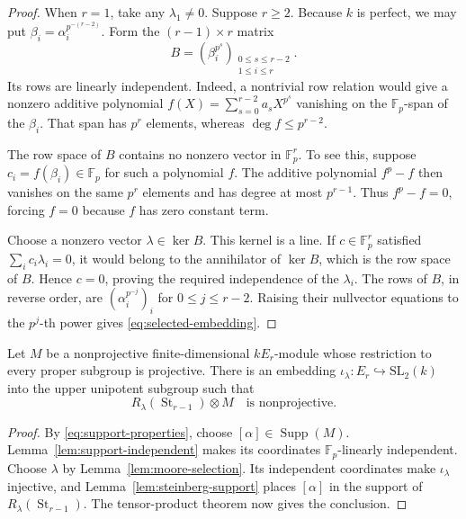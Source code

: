 \begin{proof}
When $r=1$, take any $\lambda_1\ne0$.  Suppose $r\ge2$.
Because $k$ is perfect, we may put
$\beta_i=\alpha_i^{p^{-(r-2)}}$.  Form the $(r-1)\times r$ matrix
\[
 B=(\beta_i^{p^s})_{\substack{0\le s\le r-2\\1\le i\le r}}.
\]
Its rows are linearly independent.  Indeed, a nontrivial row relation
would give a nonzero additive polynomial
$f(X)=\sum_{s=0}^{r-2}a_sX^{p^s}$ vanishing on the
$\mathbb F_p$-span of the $\beta_i$.  That span has $p^r$ elements,
whereas $\deg f\le p^{r-2}$.

The row space of $B$ contains no nonzero vector in $\mathbb F_p^r$.
To see this, suppose $c_i=f(\beta_i)\in\mathbb F_p$ for such a
polynomial $f$.  The additive polynomial $f^p-f$ then vanishes on
the same $p^r$ elements and has degree at most $p^{r-1}$.
Thus $f^p-f=0$, forcing $f=0$ because $f$ has zero constant term.

Choose a nonzero vector $\lambda\in\ker B$.  This kernel is a line.
If $c\in\mathbb F_p^r$ satisfied $\sum_i c_i\lambda_i=0$, it would
belong to the annihilator of $\ker B$, which is the row space of $B$.
Hence $c=0$, proving the required independence of the $\lambda_i$.
The rows of $B$, in reverse order, are
$(\alpha_i^{p^{-j}})_i$ for $0\le j\le r-2$.
Raising their nullvector equations to the $p^j$-th power gives
\eqref{eq:selected-embedding}.
\end{proof}

\begin{proposition}\label{prop:support-selection}
Let $M$ be a nonprojective finite-dimensional $kE_r$-module whose
restriction to every proper subgroup is projective.  There is an
embedding $\iota_\lambda:E_r\hookrightarrow\mathrm{SL}_2(k)$ into
the upper unipotent subgroup such that
\[
 R_\lambda(\operatorname{St}_{r-1})\otimes M
 \quad\text{is nonprojective}.
\]
\end{proposition}

\begin{proof}
By \eqref{eq:support-properties}, choose
$[\alpha]\in\operatorname{Supp}(M)$.
Lemma~\ref{lem:support-independent} makes its coordinates
$\mathbb F_p$-linearly independent.
Choose $\lambda$ by Lemma~\ref{lem:moore-selection}.
Its independent coordinates make $\iota_\lambda$ injective, and
Lemma~\ref{lem:steinberg-support} places $[\alpha]$ in the support of
$R_\lambda(\operatorname{St}_{r-1})$.
The tensor-product theorem now gives the conclusion.
\end{proof}

